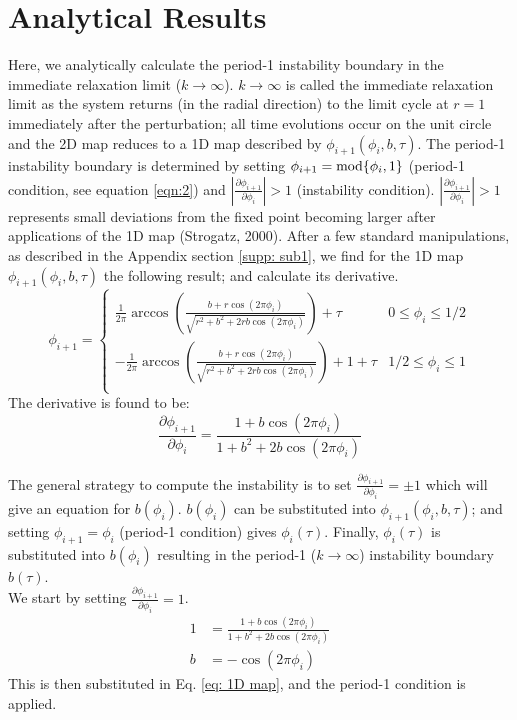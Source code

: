 \section{Analytical Results}
\indent Here, we analytically calculate the period-1 instability boundary in the immediate relaxation limit ($k \rightarrow \infty$). $k \rightarrow \infty$ is called the immediate relaxation limit as the system returns (in the radial direction) to the limit cycle at $r=1$ immediately after the perturbation; all time evolutions occur on the unit circle and the 2D map reduces to a 1D map described by $\phi_{i+1}(\phi_i, b, \tau)$. The period-1 instability boundary is determined by setting $\phi_{i+1} = \textnormal{mod} \{\phi_i,1\}$ (period-1 condition, see equation \ref{eqn:2}) and $|\frac{\partial \phi_{i+1}}{\partial \phi_i}|>1$ (instability condition). $|\frac{\partial \phi_{i+1}}{\partial \phi_i}|>1$ represents small deviations from the fixed point becoming larger after applications of the 1D map (Strogatz, 2000\supercite{Strogatz}). After a few standard manipulations, as described in the Appendix section \ref{supp: sub1}, we find for the 1D map $\phi_{i+1}(\phi_i, b, \tau)$ the following result; and calculate its derivative.
\begin{equation}
    \phi_{i+1} =
    \begin{cases}
     \frac{1}{2\pi}\arccos(\frac{b+r \cos(2\pi \phi_i)}{\sqrt{r^2+b^2+2rb\cos(2\pi \phi_i)}}) + \tau & 0 \leq \phi_i \leq 1/2 \\
    -\frac{1}{2\pi}\arccos(\frac{b+r \cos(2\pi \phi_i)}{\sqrt{r^2+b^2+2rb\cos( 2\pi \phi_i)}}) + 1 +\tau & 1/2 \leq \phi_i \leq 1 \\
    \end{cases}
    \label{eq: 1D map}
\end{equation} The derivative is found to be:
\begin{equation}
    \frac{\partial \phi_{i+1}}{\partial \phi_i} = \frac{1+b\cos(2\pi \phi_i)}{1 + b^2 + 2b\cos(2\pi \phi_i)}
\end{equation}

\indent The general strategy to compute the instability is to set $\frac{\partial \phi_{i+1}}{\partial \phi_i} = \pm 1$ which will give an equation for $b(\phi_i)$. $b(\phi_i)$ can be substituted into $\phi_{i+1}(\phi_i,b,\tau)$; and setting $\phi_{i+1} = \phi_i$ (period-1 condition) gives $\phi_i(\tau)$. Finally, $\phi_i(\tau)$ is substituted into $b(\phi_i)$ resulting in the period-1 ($k\rightarrow \infty$) instability boundary $b(\tau)$.\\
We start by setting $\frac{\partial \phi_{i+1}}{\partial \phi_i} = 1$.
\begin{align}
    1 &= \frac{1+b\cos(2\pi \phi_i)}{1 + b^2 + 2b\cos(2\pi \phi_i)} \\
    b&= -\cos(2\pi \phi_i) \label{eq: bcos}
\end{align} This is then substituted in Eq. \ref{eq: 1D map}, and the period-1 condition is applied. 

